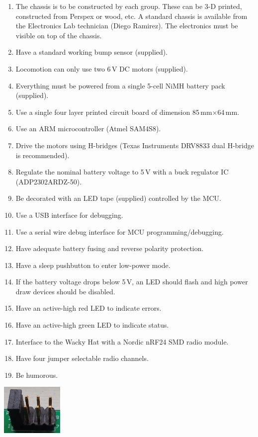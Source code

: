 \documentclass[11pt, a4paper]{article}
\begin{document}
\begin{enumerate}
\item The chassis is to be constructed by each group.  These can be 3-D printed,
  constructed from Perspex or wood, etc.  A standard chassis is available from
  the Electronics Lab technician (Diego Ramirez).  The electronics must be
  visible on top of the chassis.
\item Have a standard working bump sensor (supplied).
\item Locomotion can only use two 6\,V DC motors (supplied).
\item Everything must be powered from a single 5-cell NiMH battery pack (supplied).
\item Use a single four layer printed circuit board of dimension 85\,mm$\times$64\,mm.
\item Use an ARM microcontroller (Atmel SAM4S8).
\item Drive the motors using H-bridges (Texas Instruments DRV8833 dual
  H-bridge is recommended).
\item Regulate the nominal battery voltage to 5\,V with a buck
  regulator IC (ADP2302ARDZ-50).
\item Be decorated with an LED tape (supplied) controlled by the MCU.
\item Use a USB interface for debugging.
\item Use a serial wire debug interface for MCU programming/debugging.
\item Have adequate battery fusing and reverse polarity protection.
\item Have a sleep pushbutton to enter low-power mode.
\item If the battery voltage drops below 5\,V, an LED should flash and high power draw devices should be disabled.
\item Have an active-high red LED to indicate errors.
\item Have an active-high green LED to indicate status.
\item Interface to the Wacky Hat with a Nordic nRF24 SMD radio module.
\item Have four jumper selectable radio channels.
\item Be humorous.
\end{enumerate}

\hspace{120mm}\includegraphics[width=3cm]{../guide/figs/jumpers4.jpg}
\end{document}
